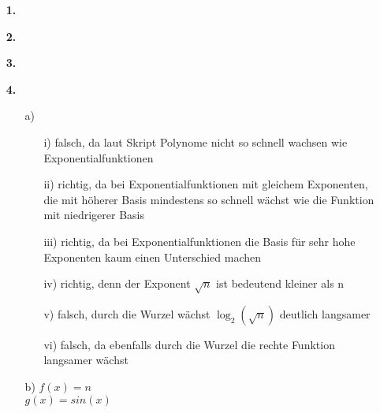 \documentclass[a4paper,11pt,fleqn]{scrartcl}
\author{\authorinfo}
\title{\titleinfo}
\date{\today}
\begin{document}
\maketitle
\begin{enumerate}
    
\item[\textbf{1.}]


\item[\textbf{2.}]


\item[\textbf{3.}]
    

\item[\textbf{4.}]
	\begin{itemize}
		\item[a)]
			\begin{itemize}
				\item[i)]
					falsch, da laut Skript Polynome nicht so schnell wachsen wie Exponentialfunktionen
				\item[ii)]
					richtig, da bei Exponentialfunktionen mit gleichem Exponenten, die mit höherer Basis mindestens so schnell wächst wie die Funktion mit niedrigerer Basis
				\item[iii)]
					richtig, da bei Exponentialfunktionen die Basis für sehr hohe Exponenten kaum einen Unterschied machen
				\item[iv)]
					richtig, denn der Exponent $\sqrt{n}$ ist bedeutend kleiner als n
				\item[v)]
					falsch, durch die Wurzel wächst $\log _2 \left(\sqrt{n}\right)$ deutlich langsamer 
				\item[vi)]
					falsch, da ebenfalls durch die Wurzel die rechte Funktion langsamer wächst
				
			\end{itemize}
		\item[b)]
			$f(x)=n$ \\
			$g(x)=sin\left(x\right) $
	\end{itemize}

\end{enumerate}
\end{document}
